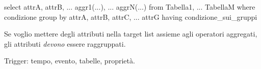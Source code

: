 select attrA, attrB, ... aggr1(...), ... aggrN(...)
from Tabella1, ... TabellaM
where condizione
group by attrA, attrB, attrC, ... attrG
having condizione_sui_gruppi

Se voglio mettere degli attributi nella target list assieme agli operatori aggregati, gli attributi \emph{devono} essere raggruppati.


Trigger: tempo, evento, tabelle, propriet\`a.























